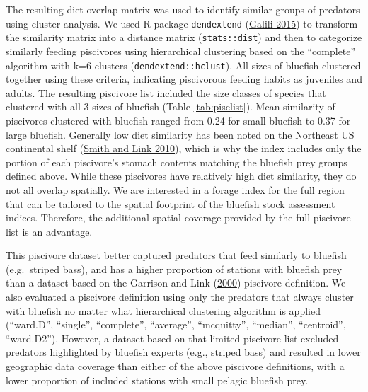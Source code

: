 \documentclass[
]{article}
\begin{document}
The resulting diet overlap matrix was used to identify similar groups of predators using cluster analysis. We used R package \texttt{dendextend} (\protect\hyperlink{ref-galili_dendextend_2015}{Galili 2015}) to transform the similarity matrix into a distance matrix (\texttt{stats::dist}) and then to categorize similarly feeding piscivores using hierarchical clustering based on the ``complete'' algorithm with k=6 clusters (\texttt{dendextend::hclust}). All sizes of bluefish clustered together using these criteria, indicating piscivorous feeding habits as juveniles and adults. The resulting piscivore list included the size classes of species that clustered with all 3 sizes of bluefish (Table \ref{tab:pisclist}). Mean similarity of piscivores clustered with bluefish ranged from 0.24 for small bluefish to 0.37 for large bluefish. Generally low diet similarity has been noted on the Northeast US continental shelf (\protect\hyperlink{ref-smith_trophic_2010}{Smith and Link 2010}), which is why the index includes only the portion of each piscivore's stomach contents matching the bluefish prey groups defined above. While these piscivores have relatively high diet similarity, they do not all overlap spatially. We are interested in a forage index for the full region that can be tailored to the spatial footprint of the bluefish stock assessment indices. Therefore, the additional spatial coverage provided by the full piscivore list is an advantage.

This piscivore dataset better captured predators that feed similarly to bluefish (e.g.~striped bass), and has a higher proportion of stations with bluefish prey than a dataset based on the Garrison and Link (\protect\hyperlink{ref-garrison_dietary_2000}{2000}) piscivore definition. We also evaluated a piscivore definition using only the predators that always cluster with bluefish no matter what hierarchical clustering algorithm is applied (``ward.D'', ``single'', ``complete'', ``average'', ``mcquitty'', ``median'', ``centroid'', ``ward.D2''). However, a dataset based on that limited piscivore list excluded predators highlighted by bluefish experts (e.g., striped bass) and resulted in lower geographic data coverage than either of the above piscivore definitions, with a lower proportion of included stations with small pelagic bluefish prey.
\end{document}
